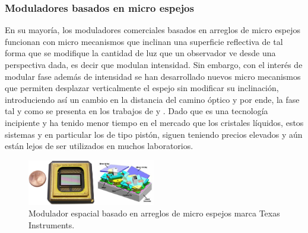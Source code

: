 \subsubsection{Moduladores basados en micro espejos}
En su mayoría, los moduladores comerciales basados en arreglos de micro
espejos funcionan con micro mecanismos que inclinan una superficie
reflectiva de tal forma que se modifique la cantidad de luz que un
observador ve desde una perspectiva dada, es decir que modulan
intensidad. Sin embargo, con el interés de modular fase además de
intensidad se han desarrollado nuevos micro mecanismos que
permiten desplazar verticalmente el espejo sin modificar su
inclinación, introduciendo así un cambio en la distancia del camino
óptico y por ende, la fase tal y como se presenta en los trabajos de
 y . Dado que es una
tecnología incipiente y ha tenido menor tiempo en el mercado que los
cristales líquidos, estos sistemas y en particular los de tipo pistón,
siguen teniendo precios elevados y aún están lejos de ser utilizados
en muchos laboratorios. 
\begin{figure}[h!]
\centering
    \includegraphics[width=0.5\textwidth]{MEMSLM.png}
\caption[Modulador espacial basado en arreglos de micro espejos]{Modulador espacial basado en arreglos de micro espejos marca Texas Instruments.}
\label{fig:MEMSLM}
\end{figure}


